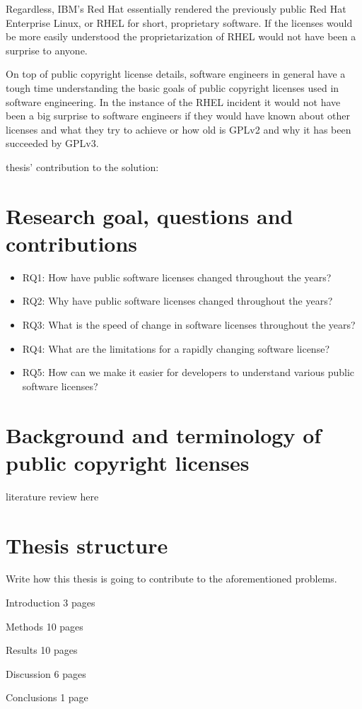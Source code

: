 Regardless, IBM's Red Hat essentially rendered the previously public Red Hat Enterprise Linux, or RHEL for short, proprietary software. If the licenses would be more easily understood the proprietarization of RHEL would not have been a surprise to anyone.

On top of public copyright license details, software engineers in general have a tough time understanding the basic goals of public copyright licenses used in software engineering. In the instance of the RHEL incident it would not have been a big surprise to software engineers if they would have known about other licenses and what they try to achieve or how old is GPLv2 and why it has been succeeded by GPLv3.

thesis' contribution to the solution:

\section{Research goal, questions and contributions}

\begin{itemize}
	\item RQ1: How have public software licenses changed throughout the years?
	\item RQ2: Why have public software licenses changed throughout the years?
	\item RQ3: What is the speed of change in software licenses throughout the years?
	\item RQ4: What are the limitations for a rapidly changing software license?
	\item RQ5: How can we make it easier for developers to understand various public software licenses?
\end{itemize}

\section{Background and terminology of public copyright licenses}
literature review here

\section{Thesis structure}

Write how this thesis is going to contribute to the aforementioned problems.

Introduction 3 pages

Methods 10 pages

Results 10 pages

Discussion 6 pages

Conclusions 1 page
